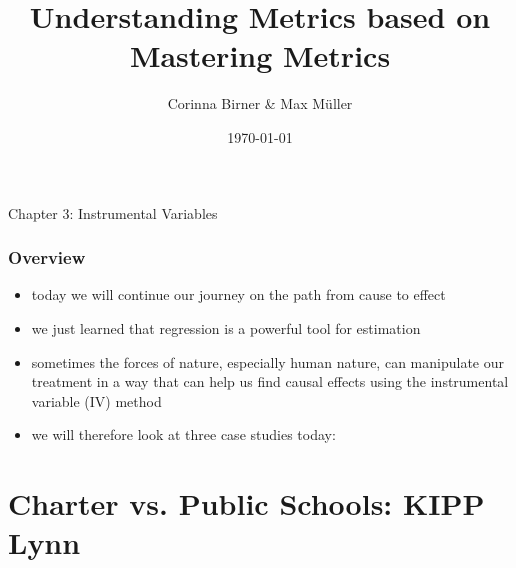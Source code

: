 \documentclass{beamer}
\title[Mastering Metrics]{Understanding Metrics based on Mastering Metrics } %
\author{Corinna Birner \& Max M{\"u}ller} %
\institute[JMU] %
{University of W{\"u}rzburg }\\ %
\date{\today} %
\begin{document}
\begin{frame}
\titlepage %
\end{frame}

\begin{frame}
\begin{center}
\textbf\Huge{Chapter 3: Instrumental Variables}
\end{center}
\end{frame}

\begin{frame}
\frametitle{Overview} %
	\begin{itemize}
		\item today we will continue our journey on the path from cause to effect 
		\item we just learned that regression is a powerful tool for estimation
		\item sometimes the forces of nature, especially human nature, can manipulate our treatment in a way that can help us find causal effects using the instrumental variable (IV) method 
		\item we will therefore look at three case studies today:
\end{itemize}
\tableofcontents %
\end{frame}



\section{Charter vs. Public Schools: KIPP Lynn} %
\end{document}
